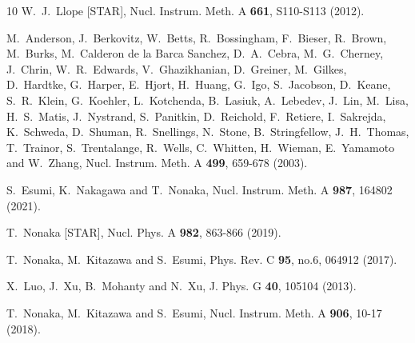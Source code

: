 \documentclass[10pt,aps,prc,twocolumn,floatfix]{revtex4-1}
\begin{document}
{\begin{thebibliography}{10}
W.~J.~Llope [STAR],
Nucl. Instrum. Meth. A \textbf{661}, S110-S113 (2012).

M.~Anderson, J.~Berkovitz, W.~Betts, R.~Bossingham, F.~Bieser, R.~Brown, M.~Burks, M.~Calderon de la Barca Sanchez, D.~A.~Cebra, M.~G.~Cherney, J.~Chrin, W.~R.~Edwards, V.~Ghazikhanian, D.~Greiner, M.~Gilkes, D.~Hardtke, G.~Harper, E.~Hjort, H.~Huang, G.~Igo, S.~Jacobson, D.~Keane, S.~R.~Klein, G.~Koehler, L.~Kotchenda, B.~Lasiuk, A.~Lebedev, J.~Lin, M.~Lisa, H.~S.~Matis, J.~Nystrand, S.~Panitkin, D.~Reichold, F.~Retiere, I.~Sakrejda, K.~Schweda, D.~Shuman, R.~Snellings, N.~Stone, B.~Stringfellow, J.~H.~Thomas, T.~Trainor, S.~Trentalange, R.~Wells, C.~Whitten, H.~Wieman, E.~Yamamoto and W.~Zhang,
Nucl. Instrum. Meth. A \textbf{499}, 659-678 (2003).

S.~Esumi, K.~Nakagawa and T.~Nonaka,
Nucl. Instrum. Meth. A \textbf{987}, 164802 (2021).

T.~Nonaka [STAR],
Nucl. Phys. A \textbf{982}, 863-866 (2019).

T.~Nonaka, M.~Kitazawa and S.~Esumi,
Phys. Rev. C \textbf{95}, no.6, 064912 (2017).

X.~Luo, J.~Xu, B.~Mohanty and N.~Xu,
J. Phys. G \textbf{40}, 105104 (2013).


T.~Nonaka, M.~Kitazawa and S.~Esumi, 
Nucl. Instrum. Meth. A \textbf{906}, 10-17 (2018).



\end{thebibliography}}
\end{document}
